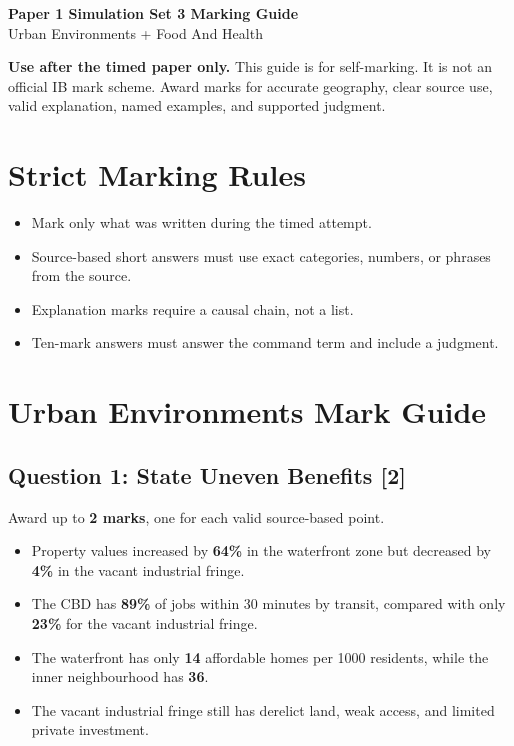 \documentclass[11pt,a4paper]{article}
\newcommand{\term}[1]{\textcolor{HeadingBlue}{\textbf{#1}}}
\newcommand{\boxnote}[3]{%
\noindent\colorbox{#1}{%
  \begin{minipage}{0.965\textwidth}
  \sffamily
  \textbf{\textcolor{HeadingBlue}{#2}} #3
  \end{minipage}
}}
\begin{document}
\begin{center}
  {\sffamily\bfseries\color{HeadingBlue}\LARGE Paper 1 Simulation Set 3 Marking Guide}\\[0.25em]
  {\sffamily\color{AccentTeal}\large Urban Environments + Food And Health}
\end{center}

\boxnote{SoftRed}{Use after the timed paper only.}{This guide is for
self-marking. It is not an official IB mark scheme. Award marks for accurate
geography, clear source use, valid explanation, named examples, and supported
judgment.}

\section{Strict Marking Rules}

\begin{itemize}
  \item Mark only what was written during the timed attempt.
  \item Source-based short answers must use exact categories, numbers, or
  phrases from the source.
  \item Explanation marks require a causal chain, not a list.
  \item Ten-mark answers must answer the command term and include a judgment.
\end{itemize}

\section{Urban Environments Mark Guide}

\subsection{Question 1: State Uneven Benefits [2]}

Award up to \term{2 marks}, one for each valid source-based point.

\begin{itemize}
  \item Property values increased by \term{64\%} in the waterfront zone but
  decreased by \term{4\%} in the vacant industrial fringe.
  \item The CBD has \term{89\%} of jobs within 30 minutes by transit, compared
  with only \term{23\%} for the vacant industrial fringe.
  \item The waterfront has only \term{14} affordable homes per 1000 residents,
  while the inner neighbourhood has \term{36}.
  \item The vacant industrial fringe still has derelict land, weak access, and
  limited private investment.
\end{itemize}
\end{document}
